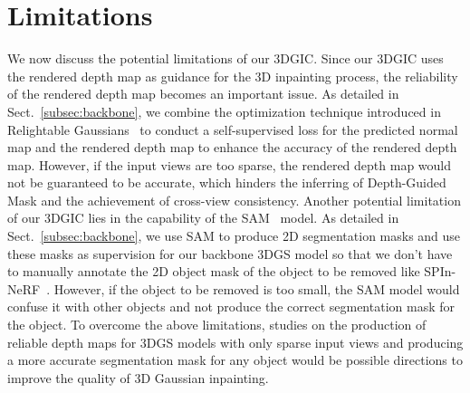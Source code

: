 \section{Limitations}
We now discuss the potential limitations of our 3DGIC. Since our 3DGIC uses the rendered depth map as guidance for the 3D inpainting process, the reliability of the rendered depth map becomes an important issue. As detailed in Sect.~\ref{subsec:backbone}, we combine the optimization technique introduced in Relightable Gaussians~\cite{gao2023relightable} to conduct a self-supervised loss for the predicted normal map and the rendered depth map to enhance the accuracy of the rendered depth map. However, if the input views are too sparse, the rendered depth map would not be guaranteed to be accurate, which hinders the inferring of Depth-Guided Mask and the achievement of cross-view consistency. Another potential limitation of our 3DGIC lies in the capability of the SAM~\cite{kirillov2023sam} model. As detailed in Sect.~\ref{subsec:backbone}, we use SAM to produce 2D segmentation masks and use these masks as supervision for our backbone 3DGS model so that we don't have to manually annotate the 2D object mask of the object to be removed like SPIn-NeRF~\cite{mirzaei2023spin}. However, if the object to be removed is too small, the SAM model would confuse it with other objects and not produce the correct segmentation mask for the object. To overcome the above limitations, studies on the production of reliable depth maps for 3DGS models with only sparse input views and producing a more accurate segmentation mask for any object would be possible directions to improve the quality of 3D Gaussian inpainting.
